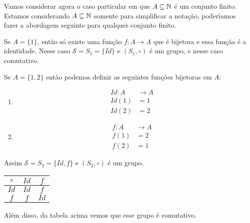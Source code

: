 Vamos considerar agora o caso particular em que $A \subseteq \mathbb{N}$ \'e um conjunto finito. Estamos considerando $A \subseteq \mathbb{N}$ somente para simplificar a nota\c{c}\~ao, poder{\'\i}amos fazer a abordagem seguinte para qualquer conjunto finito.

Se $A = \{1\}$, ent\~ao s\'o existe uma fun\c{c}\~ao $f : A \to A$ que \'e bijetora e essa fun\c{c}\~ao \'e a identidade. Nesse caso $\mathcal{S} = S_1 = \{Id\}$ e $(S_1, \circ)$ \'e um grupo, e nesse caso comutativo.


Se $A = \{1, 2\}$ ent\~ao podemos definir as seguintes fun\c{c}\~oes bijetoras em $A$:
\begin{multicols}{2}
	\begin{enumerate}
		\item[] \begin{align*}
			Id : A &\to A\\ Id(1) &= 1\\ Id(2) &= 2
		\end{align*}
		\item[]  \begin{align*}
			f : A &\to A\\ f(1) &= 2\\ f(2) &= 1
		\end{align*}
	\end{enumerate}
\end{multicols}

Assim $\mathcal{S} = S_2 = \{Id, f\}$ e $(S_2, \circ)$ \'e um grupo.
\begin{table}[!htb]
\centering
	\begin{tabular}{|c|c|c|} 
	    \hline
	    $\circ$ & $Id$ & $f$\T\\
	    \hline
	    $Id$ & $Id$ & $f$\T\\
	    \hline
	    $f$ & $f$ & $Id$\T\\
	    \hline
	\end{tabular}
\end{table}

Al\'em disso, da tabela acima vemos que esse grupo \'e comutativo.

